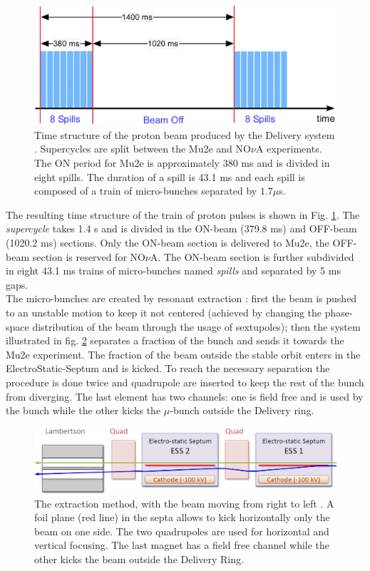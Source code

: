 \documentclass[12pt,a4paper,openright, oneside, titlepage]{book} %
\begin{document}
\begin{figure}[h!]
\centering
\includegraphics[scale=0.6]{beam_time_structure_2}
\caption[Mu2e proton beam time structure]{Time structure of the proton beam produced by the Delivery system \cite{BeamStruct}. 
Supercycles are split between the Mu2e and NO$\nu$A experiments. 
The ON period for Mu2e is approximately 380 ms and is divided in eight spills. 
The duration of a spill is 43.1 ms and each spill is composed of a train of micro-bunches 
separated by $1.7 \mu$s.}
\label{_beam_time_structure}
\end{figure}

\noindent
The resulting time structure of the train of proton pulses is shown in Fig. \ref{_beam_time_structure}.
The \textit{supercycle} takes 1.4 s and is divided in the ON-beam (379.8 ms) and OFF-beam (1020.2 ms) sections. 
Only the ON-beam section is delivered to Mu2e, the OFF-beam section is reserved for NO$\nu$A.
The ON-beam section is further subdivided in eight 43.1 ms trains of micro-bunches
named \textit{spills} and  separated by 5 ms gaps.\\
The micro-bunches are created by resonant extraction \cite{Extraction}: 
first the beam is pushed to an unstable motion to keep it not centered (achieved by changing the phase-space distribution of the beam through the usage of sextupoles); 
then the system illustrated in fig. \ref{_Extraction} separates a fraction of the bunch  
and sends it towards the Mu2e experiment. 
The fraction of the beam outside the stable orbit enters in the ElectroStatic-Septum and is kicked. 
To reach the necessary separation the procedure is done twice and quadrupole are inserted to keep the rest of the bunch from diverging.
The last element has two channels: one is field free and is used by the bunch while the other kicks the $\mu$-bunch outside the Delivery ring.

\begin{figure}[h!]
\centering
\includegraphics[scale=0.7]{Extraction}
\caption[Resonant extraction]{The extraction method, with the beam moving from right to left \cite{Extraction}. A foil plane (red line) in the septa allows to kick horizontally only the beam on one side. The two quadrupoles are used for horizontal and vertical focusing. The last magnet has a field free channel while the other kicks the beam outside the Delivery Ring.}
\label{_Extraction}
\end{figure}
\end{document}
